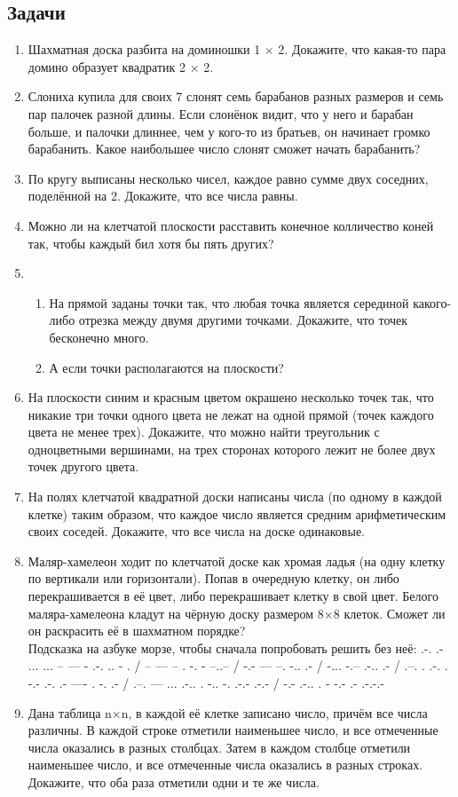 \documentclass[a4paper,12pt]{article}
\begin{document}
    \subsection*{Задачи}
    \begin{enumerate}
        \item Шахматная доска разбита на доминошки 1 × 2. Докажите, что
какая-то пара домино образует квадратик 2 × 2.
        \item Слониха купила для своих 7 слонят семь барабанов разных размеров и семь пар палочек разной длины. Если слонёнок видит, что у него и барабан больше, и палочки длиннее, чем у кого-то из братьев, он начинает громко барабанить. Какое наибольшее число слонят сможет начать барабанить?
        \item По кругу выписаны несколько чисел, каждое равно сумме двух соседних, поделённой на 2. Докажите, что все числа равны.
        \item Можно ли на клетчатой плоскости расставить конечное колличество коней так, чтобы каждый бил хотя бы пять других?
        \item \begin{enumerate}
            \item На прямой заданы точки так, что любая точка является серединой какого-либо отрезка между двумя другими точками. Докажите, что точек бесконечно много.
            \item А если точки располагаются на плоскости?
        \end{enumerate}
        \item На плоскости синим и красным цветом окрашено несколько точек так, что никакие три точки одного цвета не лежат на одной прямой (точек каждого цвета не менее трех). Докажите, что можно найти треугольник с одноцветными вершинами, на трех сторонах которого лежит не более двух точек другого цвета. 
        \item На полях клетчатой квадратной доски написаны числа (по одному в каждой клетке) таким образом, что каждое число является средним арифметическим  своих соседей. Докажите, что все числа на доске одинаковые.
        \item Маляр-хамелеон ходит по клетчатой доске как хромая ладья (на одну клетку по вертикали или горизонтали). Попав в очередную клетку, он либо перекрашивается в её цвет, либо перекрашивает клетку в свой цвет. Белого маляра-хамелеона кладут на чёрную доску размером 8×8 клеток. Сможет ли он раскрасить её в шахматном порядке? \\
        Подсказка на азбуке морзе, чтобы сначала попробовать решить без неё: .-. .- ... ... -- --- - .-. .. - . / -- --- -- . -. - --..-- / -.- --- --. -.. .- / -... -.-- .-.. .- / .--. . .-. . -.- .-. .- ---- . -. .- / .--. --- ... .-.. . -.. -. .-.- .-.- / -.- .-.. . - -.- .- .-.-.-
        \item Дана таблица n×n, в каждой её клетке записано число, причём все числа различны. В каждой строке отметили наименьшее число, и все отмеченные числа оказались в разных столбцах. Затем в каждом столбце отметили наименьшее число, и все отмеченные числа оказались в разных строках. Докажите, что оба раза отметили одни и те же числа.
    \end{enumerate}
\end{document}
